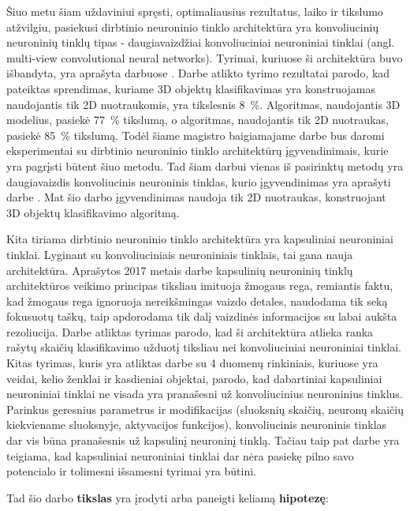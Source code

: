 Šiuo metu šiam uždaviniui spręsti, optimaliausius  rezultatus, laiko ir tikslumo atžvilgiu, pasiekusi dirbtinio neuroninio tinklo architektūra yra konvoliucinių neuroninių tinklų tipas - daugiavaizdžiai konvoliuciniai neuroniniai tinklai (angl. multi-view convolutional neural networks). Tyrimai, kuriuose ši architektūra buvo išbandyta, yra aprašyta darbuose \cite{cnnExp1, cnnExp2}. Darbe \cite{dbnExp} atlikto tyrimo rezultatai parodo, kad pateiktas sprendimas, kuriame 3D objektų klasifikavimas yra konstruojamas naudojantis tik 2D nuotraukomis, yra tikslesnis 8~\%. Algoritmas, naudojantis 3D modelius, pasiekė 77~\% tikslumą, o algoritmas, naudojantis tik 2D nuotraukas, pasiekė 85~\% tikslumą. Todėl šiame magistro baigiamajame darbe bus daromi eksperimentai su dirbtinio neuroninio tinklo architektūrų įgyvendinimais, kurie yra pagrįsti būtent šiuo metodu. Tad šiam darbui vienas iš pasirinktų metodų yra daugiavaizdis konvoliucinis neuroninis tinklas, kurio įgyvendinimas yra aprašyti darbe \cite{cnnExp1}. Mat šio darbo įgyvendinimas naudoja tik 2D nuotraukas, konstruojant 3D objektų klasifikavimo algoritmą.

Kita tiriama dirbtinio neuroninio tinklo architektūra yra kapsuliniai neuroniniai tinklai. Lyginant su konvoliuciniais neuroniniais tinklais, tai gana nauja architektūra. Aprašytos 2017 metais darbe \cite{capsNet} kapsulinių neuroninių tinklų architektūros veikimo principas tiksliau imituoja žmogaus rega, remiantis faktu, kad žmogaus rega ignoruoja nereikšmingas vaizdo detales, naudodama tik seką fokusuotų taškų, taip apdorodama tik dalį vaizdinės informacijos su labai aukšta rezoliucija. Darbe \cite{capsNet} atliktas tyrimas parodo, kad ši architektūra atlieka ranka rašytų skaičių klasifikavimo užduotį tiksliau nei konvoliuciniai neuroniniai tinklai. Kitas tyrimas, kuris yra atliktas darbe \cite{capsCNN} su 4 duomenų rinkiniais, kuriuose yra veidai, kelio ženklai ir kasdieniai objektai, parodo, kad dabartiniai kapsuliniai neuroniniai tinklai ne visada yra pranašesni už konvoliucinius neuroninius tinklus. Parinkus geresnius parametrus ir modifikacijas (sluoksnių skaičių, neuronų skaičių kiekviename sluoksnyje, aktyvacijos funkcijos), konvoliucinis neuroninis tinklas dar vis būna pranašesnis už kapsulinį neuroninį tinklą. Tačiau taip pat darbe \cite{capsCNN} yra teigiama, kad kapsuliniai neuroniniai tinklai dar nėra pasiekę pilno savo potencialo ir tolimesni išsamesni tyrimai yra būtini.

Tad šio darbo \textbf{tikslas} yra įrodyti arba paneigti keliamą \textbf{hipotezę}:

